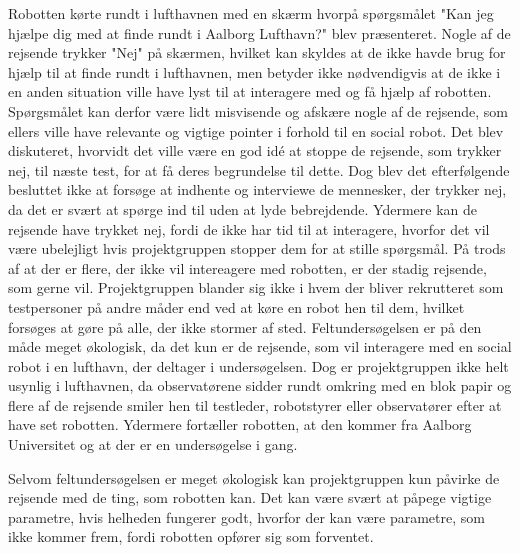 Robotten kørte rundt i lufthavnen med en skærm hvorpå spørgsmålet "Kan jeg hjælpe dig med at finde rundt i Aalborg Lufthavn?" blev præsenteret. Nogle af de rejsende trykker "Nej" på skærmen, hvilket kan skyldes at de ikke havde brug for hjælp til at finde rundt i lufthavnen, men betyder ikke nødvendigvis at de ikke i en anden situation ville have lyst til at interagere med og få hjælp af robotten. Spørgsmålet kan derfor være lidt misvisende og afskære nogle af de rejsende, som ellers ville have relevante og vigtige pointer i forhold til en social robot. Det blev diskuteret, hvorvidt det ville være en god idé at stoppe de rejsende, som trykker nej, til næste test, for at få deres begrundelse til dette. Dog blev det efterfølgende besluttet ikke at forsøge at indhente og interviewe de mennesker, der trykker nej, da det er svært at spørge ind til uden at lyde bebrejdende. Ydermere kan de rejsende have trykket nej, fordi de ikke har tid til at interagere, hvorfor det vil være ubelejligt hvis projektgruppen stopper dem for at stille spørgsmål.\blankline
%
På trods af at der er flere, der ikke vil intereagere med robotten, er der stadig rejsende, som gerne vil. Projektgruppen blander sig ikke i hvem der bliver rekrutteret som testpersoner på andre måder end ved at køre en robot hen til dem, hvilket forsøges at gøre på alle, der ikke stormer af sted. Feltundersøgelsen er på den måde meget økologisk, da det kun er de rejsende, som vil interagere med en social robot i en lufthavn, der deltager i undersøgelsen. Dog er projektgruppen ikke helt usynlig i lufthavnen, da observatørene sidder rundt omkring med en blok papir og flere af de rejsende smiler hen til testleder, robotstyrer eller observatører efter at have set robotten. Ydermere fortæller robotten, at den kommer fra Aalborg Universitet og at der er en undersøgelse i gang.\blankline

Selvom feltundersøgelsen er meget økologisk kan projektgruppen kun påvirke de rejsende med de ting, som robotten kan. Det kan være svært at påpege vigtige parametre, hvis helheden fungerer godt, hvorfor der kan være parametre, som ikke kommer frem, fordi robotten opfører sig som forventet.

